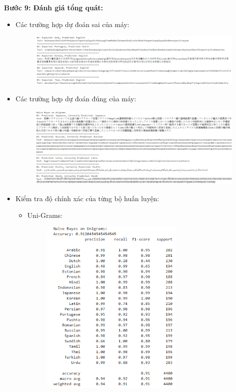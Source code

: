 \textbf{Bước 9: Đánh giá tổng quát:}
\begin{itemize}
    \item Các trường hợp dự đoán sai của máy:
    \begin{figure}[H]
    \centering
    \includegraphics[width=1\textwidth]{img/docspics/Picture19.png}
\end{figure}
    \item Các trường hợp dự đoán đúng của máy:
    \begin{figure}[H]
    \centering
    \includegraphics[width=1\textwidth]{img/docspics/Picture20.png}
\end{figure}
    \item Kiểm tra độ chính xác của từng bộ huấn luyện:
    \begin{itemize}
        \item Uni-Grams:
        \begin{figure}[H]
    \centering
    \includegraphics[width=0.7\textwidth]{img/docspics/Picture21.png}

\end{figure}
\end{itemize}
\end{itemize}
